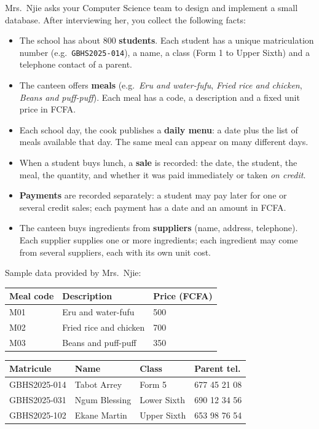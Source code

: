 \documentclass[11pt]{article}
\begin{document}
Mrs.\ Njie asks your Computer Science team to design and implement a small database. After interviewing her, you collect the following facts:

\begin{itemize}
\item The school has about 800 \textbf{students}. Each student has a unique matriculation number (e.g.\ \texttt{GBHS2025-014}), a name, a class (Form 1 to Upper Sixth) and a telephone contact of a parent.
\item The canteen offers \textbf{meals} (e.g.\ \emph{Eru and water-fufu}, \emph{Fried rice and chicken}, \emph{Beans and puff-puff}). Each meal has a code, a description and a fixed unit price in FCFA.
\item Each school day, the cook publishes a \textbf{daily menu}: a date plus the list of meals available that day. The same meal can appear on many different days.
\item When a student buys lunch, a \textbf{sale} is recorded: the date, the student, the meal, the quantity, and whether it was paid immediately or taken \emph{on credit}.
\item \textbf{Payments} are recorded separately: a student may pay later for one or several credit sales; each payment has a date and an amount in FCFA.
\item The canteen buys ingredients from \textbf{suppliers} (name, address, telephone). Each supplier supplies one or more ingredients; each ingredient may come from several suppliers, each with its own unit cost.
\end{itemize}

Sample data provided by Mrs.\ Njie:

\begin{center}
\begin{tabularx}{\linewidth}{|l|X|l|}\hline
\rowcolor{popblueL}\textbf{Meal code} & \textbf{Description} & \textbf{Price (FCFA)} \\ \hline
M01 & Eru and water-fufu & 500 \\ \hline
M02 & Fried rice and chicken & 700 \\ \hline
M03 & Beans and puff-puff & 350 \\ \hline
\end{tabularx}
\end{center}

\begin{center}
\begin{tabularx}{\linewidth}{|l|X|l|l|}\hline
\rowcolor{popblueL}\textbf{Matricule} & \textbf{Name} & \textbf{Class} & \textbf{Parent tel.} \\ \hline
GBHS2025-014 & Tabot Arrey & Form 5 & 677 45 21 08 \\ \hline
GBHS2025-031 & Ngum Blessing & Lower Sixth & 690 12 34 56 \\ \hline
GBHS2025-102 & Ekane Martin & Upper Sixth & 653 98 76 54 \\ \hline
\end{tabularx}
\end{center}
\end{document}
